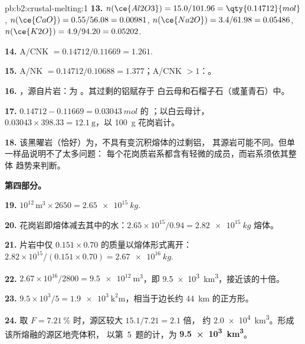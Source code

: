\begin{solution}{pb:b2:crustal-melting:1}
\textbf{13.} $n(\ce{Al2O3}) = 15.0/101.96 = \qty{0.14712}{mol}$, $n(\ce{CaO}) =
0.55/56.08 = 0.00981$, $n(\ce{Na2O}) = 3.4/61.98 = 0.05486$, $n(\ce{K2O}) = 4.9/94.20 =
0.05202$.

\textbf{14.} A/CNK $= 0.14712/0.11669 = 1.261$.

\textbf{15.} A/NK $= 0.14712/0.10688 = 1.377$；A/CNK $> 1$：。

\textbf{16.} ，源自片岩：为 。其过剩的铝赋存于
白云母和石榴子石（或堇青石）中。

\textbf{17.} $0.14712 - 0.11669 = \qty{0.03043}{mol}$ 的 ；以白云母计，
$0.03043\times398.33 = \qty{12.1}{\gram}$，以 \qty{100}{\gram} 花岗岩计。

\textbf{18.} 该黑曜岩（恰好）为，不具有变沉积熔体的过剩铝，
其源岩可能不同。但单一样品说明不了太多问题：
每个花岗质岩系都含有轻微的成员，而岩系须依其整体
趋势来判断。

\noindent\textbf{第四部分。}

\textbf{19.} $10^{12}\,\unit{\cubic\metre}\times2650 = \qty{2.65e15}{kg}$.

\textbf{20.} 花岗岩即熔体减去其中的水：$2.65\times10^{15}/0.94 =
\qty{2.82e15}{kg}$ 熔体。

\textbf{21.} 片岩中仅 $0.151\times0.70$ 的质量以熔体形式离开：
$2.82\times10^{15}/(0.151\times0.70) = \qty{2.67e16}{kg}$.

\textbf{22.} $2.67\times10^{16}/2800 = \qty{9.5e12}{\cubic\metre}$，即
\qty{9.5e3}{\cubic\kilo\metre}，接近该的十倍。

\textbf{23.} $9.5\times10^3/5 = \qty{1.9e3}{\square\kilo\metre}$，相当于边长约
\qty{44}{km} 的正方形。

\textbf{24.} 取 $F = \qty{7.21}{\percent}$ 时，源区较大 $15.1/7.21 = 2.1$ 倍，
约 \qty{2.0e4}{\cubic\kilo\metre}。形成该所熔融的源区地壳体积，
以第~5~题的计，为
\textbf{\qty[text-series-to-math=true]{9.5e3}{\cubic\kilo\metre}}。
\end{solution}
